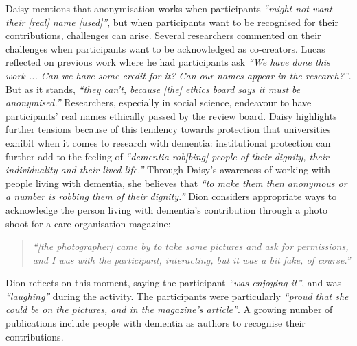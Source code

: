 Daisy mentions that anonymisation works when participants \textit{``might not want their [real] name [used]''}, but when participants want to be recognised for their contributions, challenges can arise. Several researchers commented on their challenges when participants want to be acknowledged as co-creators. Lucas reflected on previous work where he had participants ask \textit{``We have done this work ... Can we have some credit for it? Can our names appear in the research?''}. But as it stands, \textit{``they can't, because [the] ethics board says it must be anonymised.''} Researchers, especially in social science, endeavour to have participants' real names ethically passed by the review board. Daisy highlights further tensions because of this tendency towards protection that universities exhibit when it comes to research with dementia: institutional protection can further add to the feeling of \textit{``dementia rob[bing] people of their dignity, their individuality and their lived life.''} Through Daisy's awareness of working with people living with dementia, she believes that \textit{``to make them then anonymous or a number is robbing them of their dignity.''} Dion considers appropriate ways to acknowledge the person living with dementia's contribution through a photo shoot for a care organisation magazine: 
\begin{quote}
\textit{``[the photographer] came by to take some pictures and ask for permissions, and I was with the participant, interacting, but it was a bit fake, of course.'' 
}
\end{quote}

Dion reflects on this moment, saying the participant \textit{``was enjoying it''}, and was \textit{``laughing''} during the activity. The participants were particularly \textit{``proud that she could be on the pictures, and in the magazine's article''}. A growing number of publications include people with dementia as authors to recognise their contributions. 


